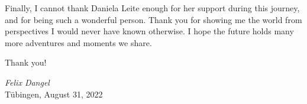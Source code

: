 Finally, I cannot thank Daniela Leite enough for her support during this
journey, and for being such a wonderful person. Thank you for showing me the
world from perspectives I would never have known otherwise. I hope the future
holds many more adventures and moments we share.

Thank you!

\begin{flushright}
  \textit{Felix Dangel}\\
  T\"ubingen, August 31, 2022
\end{flushright}

